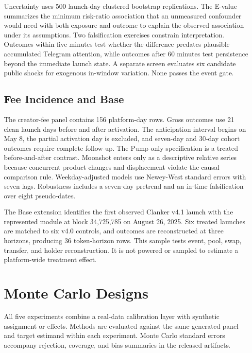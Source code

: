 \documentclass{article}
\begin{document}
Uncertainty uses 500 launch-day clustered bootstrap replications. The E-value summarizes the minimum risk-ratio association that an unmeasured confounder would need with both exposure and outcome to explain the observed association under its assumptions. Two falsification exercises constrain interpretation. Outcomes within five minutes test whether the difference predates plausible accumulated Telegram attention, while outcomes after 60 minutes test persistence beyond the immediate launch state. A separate screen evaluates six candidate public shocks for exogenous in-window variation. None passes the event gate.

\subsection{Fee Incidence and Base}

The creator-fee panel contains 156 platform-day rows. Gross outcomes use 21 clean launch days before and after activation. The anticipation interval begins on May 8, the partial activation day is excluded, and seven-day and 30-day cohort outcomes require complete follow-up. The Pump-only specification is a treated before-and-after contrast. Moonshot enters only as a descriptive relative series because concurrent product changes and displacement violate the causal comparison rule. Weekday-adjusted models use Newey-West standard errors with seven lags. Robustness includes a seven-day pretrend and an in-time falsification over eight pseudo-dates.

The Base extension identifies the first observed Clanker v4.1 launch with the represented module at block 34,725,785 on August 26, 2025. Six treated launches are matched to six v4.0 controls, and outcomes are reconstructed at three horizons, producing 36 token-horizon rows. This sample tests event, pool, swap, transfer, and holder reconstruction. It is not powered or sampled to estimate a platform-wide treatment effect.

\section{Monte Carlo Designs}
\label{app:simulation-designs}

All five experiments combine a real-data calibration layer with synthetic assignment or effects. Methods are evaluated against the same generated panel and target estimand within each experiment. Monte Carlo standard errors accompany rejection, coverage, and bias summaries in the released artifacts.
\end{document}
